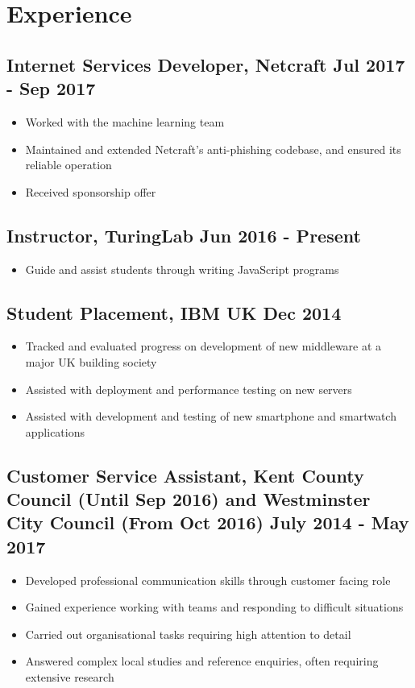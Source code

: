 \documentclass[a4paper, 8pt]{extarticle}
\begin{document}
\begin{minipage}[t]{.65\textwidth}
\section*{Experience}

\subsection*{Internet Services Developer, Netcraft \hfill Jul 2017 - Sep 2017}
\begin{itemize}
	\item Worked with the machine learning team
	\item Maintained and extended Netcraft's anti-phishing codebase, and ensured its reliable operation
	\item Received sponsorship offer
\end{itemize}

\subsection*{Instructor, TuringLab \hfill Jun 2016 - Present}
\begin{itemize}
	\item Guide and assist students through writing JavaScript programs
\end{itemize}

\subsection*{Student Placement, IBM UK \hfill Dec 2014}
\begin{itemize}
	\item Tracked and evaluated progress on development of new middleware at a major UK building society
	\item Assisted with deployment and performance testing on new servers
	\item Assisted with development and testing of new smartphone and smartwatch applications
\end{itemize}

\subsection*{Customer Service Assistant, Kent County Council (Until Sep 2016) and Westminster City Council (From Oct 2016) \hfill July 2014 - May 2017}
\begin{itemize}
	\item Developed professional communication skills through customer facing role
	\item Gained experience working with teams and responding to difficult situations
	\item Carried out organisational tasks requiring high attention to detail
	\item Answered complex local studies and reference enquiries, often requiring extensive research
\end{itemize}



\end{minipage}
\end{document}
